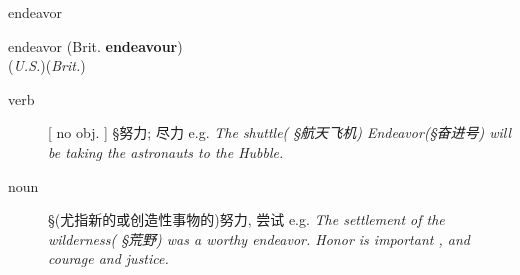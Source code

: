 \documentclass[avery5372, grid]{flashcards}
\begin{document}
\begin{flashcard}[{\B  7 Habits} {\S 词汇}]{\Huge endeavor}
	\begin{center}
		{\LARGE en\textbullet deav\textbullet or} \normalsize{({\A Brit.} \textbf{endeavour})}\\
		(\textit{U.S.})\hspace{0.25cm}(\textit{Brit.})
	\end{center}
	\begin{description}
		
		\item[verb] %
			 [ no obj. ]
			 {\S 努力; 尽力} e.g. \textit{The shuttle\textnormal{( {\S 航天飞机})} Endeavor\textnormal{({\S 奋进号})} will be taking the astronauts to the Hubble.}
			
			
			
		
		\item[noun] %
			{\S (尤指新的或创造性事物的)努力, 尝试} e.g. \textit{The settlement of the wilderness\textnormal{( {\S 荒野})} was a worthy endeavor. Honor is important , and courage and justice.}
			
			

\end{description}
\end{flashcard}
\end{document}
